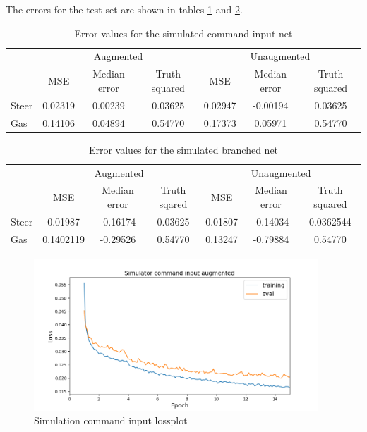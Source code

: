 \documentclass[a4paper]{article}
\begin{document}
The errors for the test set are shown in tables \ref{tab:error_command_aug} and \ref{tab:error_branched}.%
\begin{table}[H]
  \centering
  \caption{Error values for the simulated command input net}
  \label{tab:error_command_aug}
  \begin{tabular}{lccc|ccc}
    &\multicolumn{3}{c|}{Augmented} & \multicolumn{3}{c}{Unaugmented} \\
    & MSE & Median error & Truth squared & MSE & Median error & Truth squared\\ \hline
    Steer & 0.02319 & 0.00239 & 0.03625 & 0.02947 & -0.00194 & 0.03625 \\
    Gas & 0.14106 & 0.04894 & 0.54770 & 0.17373 & 0.05971 & 0.54770
  \end{tabular}
\end{table}
\begin{table}[H]
  \centering
  \caption{Error values for the simulated branched net}
  \label{tab:error_branched}
  \begin{tabular}{lccc|ccc}
    &\multicolumn{3}{c|}{Augmented} & \multicolumn{3}{c}{Unaugmented} \\
    & MSE & Median error & Truth sqared & MSE & Median error & Truth squared\\ \hline
    Steer & 0.01987 & -0.16174 & 0.03625 & 0.01807 & -0.14034 & 0.0362544 \\
    Gas & 0.1402119 & -0.29526 & 0.54770 & 0.13247 & -0.79884 & 0.54770
  \end{tabular}
\end{table}
\begin{figure}[!htbp]
  \centering
  \includegraphics[width=0.95\textwidth]{figures/sim_command_input_aug_lossplot}
  \caption{Simulation command input lossplot}
  \label{fig:augmented_command_loss}
\end{figure}
\end{document}

